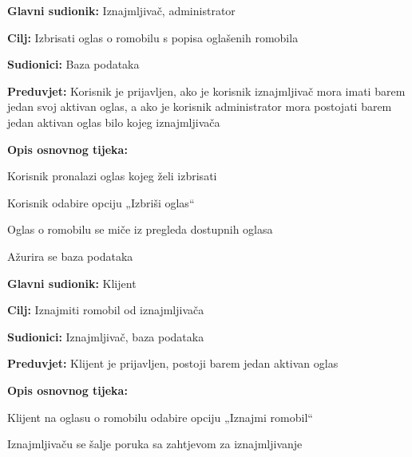 						\noindent {}
						\begin{packed_item}
							
							\item \textbf{Glavni sudionik: }Iznajmljivač, administrator
							\item  \textbf{Cilj: }Izbrisati oglas o romobilu s popisa oglašenih romobila
							\item  \textbf{Sudionici: }Baza podataka
							\item  \textbf{Preduvjet: }Korisnik je prijavljen, ako je korisnik iznajmljivač mora imati barem jedan svoj aktivan oglas, a ako je korisnik administrator mora postojati barem jedan aktivan oglas bilo kojeg iznajmljivača
							\item  \textbf{Opis osnovnog tijeka:}
							
							\item[] \begin{packed_enum}
								\item Korisnik pronalazi oglas kojeg želi izbrisati
								\item Korisnik odabire opciju „Izbriši oglas“
								\item Oglas o romobilu se miče iz pregleda dostupnih oglasa
								\item Ažurira se baza podataka
								
							\end{packed_enum}	
						\end{packed_item}
						\noindent \underbar{\textbf{UC19 - Iznajmi romobil}}
						\begin{packed_item}
							
							\item \textbf{Glavni sudionik: }Klijent
							\item  \textbf{Cilj: }Iznajmiti romobil od iznajmljivača
							\item  \textbf{Sudionici: }Iznajmljivač, baza podataka
							\item  \textbf{Preduvjet: }Klijent je prijavljen, postoji barem jedan aktivan oglas
							\item  \textbf{Opis osnovnog tijeka:}
							
							\item[] \begin{packed_enum}
								\item Klijent na oglasu o romobilu odabire opciju „Iznajmi romobil“
								\item Iznajmljivaču se šalje poruka sa zahtjevom za iznajmljivanje
							
							\end{packed_enum}	
						\end{packed_item}
